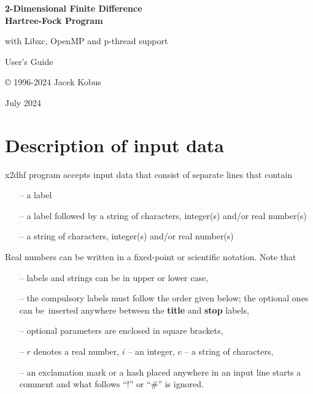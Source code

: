 \documentclass[10pt,a4paper]{article}
\newcommand{\clearemptydoublepage}{\newpage{\pagestyle{empty}\cleardoublepage}}
\begin{document}
\thispagestyle{empty}

\vspace*{4cm}
\begin{center}

{\LARGE\bf 2-Dimensional Finite Difference \\[10pt]
Hartree-Fock Program}

\vskip 0.5cm

{\large with Libxc, OpenMP and p-thread support }

\vskip 1.0cm

{\Large User's Guide}

\vskip 1.0cm

{\large  © 1996-2024 Jacek Kobus \\[10pt]}

{ July 2024\\[10pt]}

\end{center}

\clearemptydoublepage
\tableofcontents
\thispagestyle{empty}
\clearemptydoublepage
\section{Description of input data}

x2dhf program accepts input data that consist of separate lines that contain
\begin{itemize}
\item[--] a label
\item[--] a label followed by a string of characters, integer(s)
  and/or real number(s)
\item[--] a string of characters, integer(s) and/or real number(s)
\end{itemize}
Real numbers can be written in a fixed-point or scientific notation.
\noindent
Note that
\begin{itemize}
\item[--] labels and strings can be in upper or lower case,

\item[--] the compulsory labels must follow the order given below; the
  optional ones can be~inserted anywhere between the \textbf{title}
  and \textbf{stop} labels,

\item[--] optional parameters are enclosed in square brackets,

\item[--] $r$ denotes a real number, $i$ -- an integer, $c$ -- a string
          of characters,

\item[--] an exclamation mark or a hash placed anywhere in an input
  line starts a comment and what follows ``!'' or ``\#'' is ignored.

\end{itemize}
\end{document}

